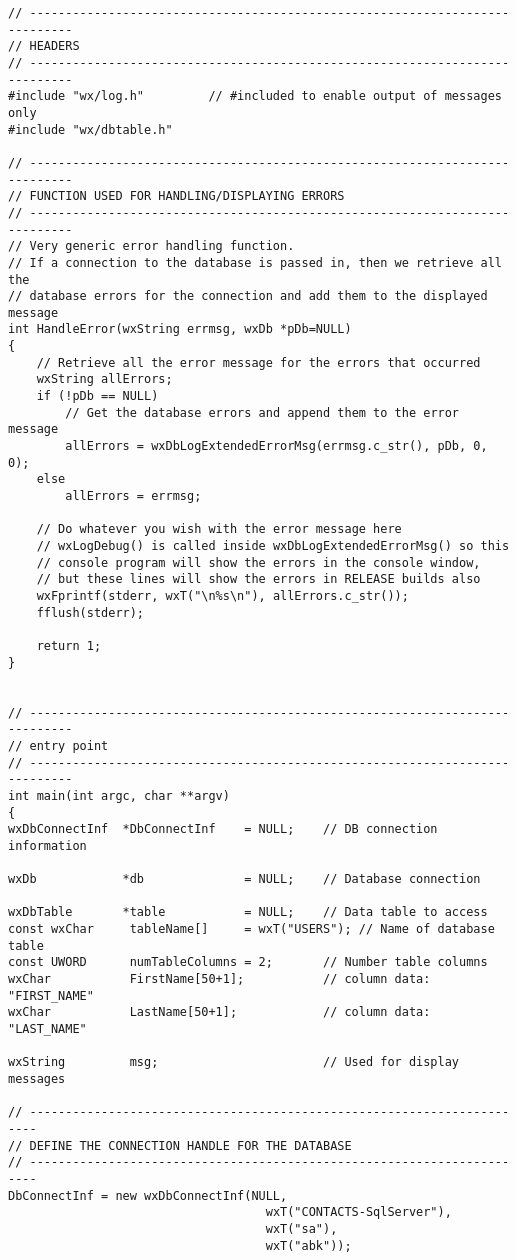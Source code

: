 \begin{verbatim}
// ----------------------------------------------------------------------------
// HEADERS
// ----------------------------------------------------------------------------
#include "wx/log.h"         // #included to enable output of messages only
#include "wx/dbtable.h"

// ----------------------------------------------------------------------------
// FUNCTION USED FOR HANDLING/DISPLAYING ERRORS
// ----------------------------------------------------------------------------
// Very generic error handling function.  
// If a connection to the database is passed in, then we retrieve all the 
// database errors for the connection and add them to the displayed message
int HandleError(wxString errmsg, wxDb *pDb=NULL)
{
    // Retrieve all the error message for the errors that occurred
    wxString allErrors;
    if (!pDb == NULL)
        // Get the database errors and append them to the error message
        allErrors = wxDbLogExtendedErrorMsg(errmsg.c_str(), pDb, 0, 0);
    else
        allErrors = errmsg;

    // Do whatever you wish with the error message here
    // wxLogDebug() is called inside wxDbLogExtendedErrorMsg() so this
    // console program will show the errors in the console window,
    // but these lines will show the errors in RELEASE builds also
    wxFprintf(stderr, wxT("\n%s\n"), allErrors.c_str());
    fflush(stderr);

    return 1;
}


// ----------------------------------------------------------------------------
// entry point
// ----------------------------------------------------------------------------
int main(int argc, char **argv)
{
wxDbConnectInf  *DbConnectInf    = NULL;    // DB connection information

wxDb            *db              = NULL;    // Database connection

wxDbTable       *table           = NULL;    // Data table to access
const wxChar     tableName[]     = wxT("USERS"); // Name of database table
const UWORD      numTableColumns = 2;       // Number table columns
wxChar           FirstName[50+1];           // column data: "FIRST_NAME"
wxChar           LastName[50+1];            // column data: "LAST_NAME"

wxString         msg;                       // Used for display messages

// -----------------------------------------------------------------------
// DEFINE THE CONNECTION HANDLE FOR THE DATABASE
// -----------------------------------------------------------------------
DbConnectInf = new wxDbConnectInf(NULL, 
                                    wxT("CONTACTS-SqlServer"),
                                    wxT("sa"),
                                    wxT("abk"));


\end{verbatim}
